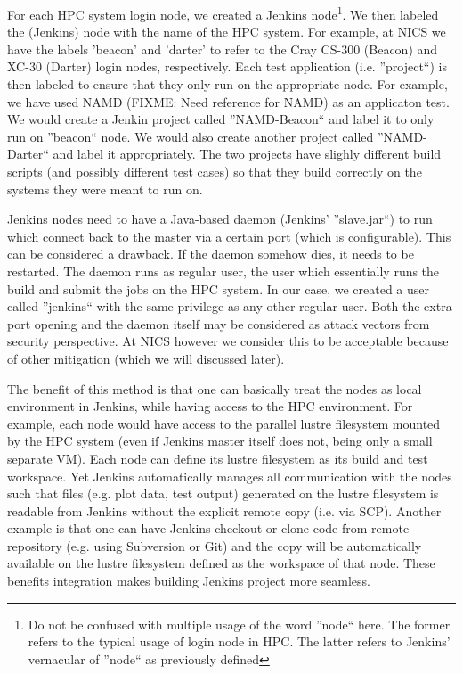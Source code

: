 \documentclass[10pt, conference, compsocconf]{IEEEtran}
\begin{document}
For each HPC system login node, we created a Jenkins node\footnote{Do not be confused with multiple usage of the word ''node`` here. The former refers to the typical usage of login node in HPC. The latter refers to Jenkins' vernacular of ''node`` as previously defined}. We then labeled the (Jenkins) node with the name of the HPC system. For example, at NICS we have the labels 'beacon' and 'darter' to refer to the Cray CS-300 (Beacon) and XC-30 (Darter) login nodes, respectively. Each test application (i.e. ''project``) is then labeled to ensure that they only run on the appropriate node. For example, we have used NAMD (FIXME: Need reference for NAMD) as an applicaton test. We would create a Jenkin project called ''NAMD-Beacon`` and label it to only run on ''beacon`` node. We would also create another project called ''NAMD-Darter`` and label it appropriately. The two projects have slighly different build scripts (and possibly different test cases) so that they build correctly on the systems they were meant to run on.

Jenkins nodes need to have a Java-based daemon (Jenkins' ''slave.jar``) to run which connect back to the master via a certain port (which is configurable). This can be considered a drawback. If the daemon somehow dies, it needs to be restarted. The daemon runs as regular user, the user which essentially runs the build and submit the jobs on the HPC system. In our case, we created a user called ''jenkins`` with the same privilege as any other regular user. Both the extra port opening and the daemon itself may be considered as attack vectors from security perspective. At NICS however we consider this to be acceptable because of other mitigation (which we will discussed later).

The benefit of this method is that one can basically treat the nodes as local environment in Jenkins, while having access to the HPC environment. For example, each node would have access to the parallel lustre filesystem mounted by the HPC system (even if Jenkins master itself does not, being only a small separate VM). Each node can define its lustre filesystem as its build and test workspace. Yet Jenkins automatically manages all communication with the nodes such that files (e.g. plot data, test output) generated on the lustre filesystem is readable from Jenkins without the explicit remote copy (i.e. via SCP). Another example is that one can have Jenkins checkout or clone code from remote repository (e.g. using Subversion or Git) and the copy will be automatically available on the lustre filesystem defined as the workspace of that node. These benefits integration makes building Jenkins project more seamless.
\end{document}
